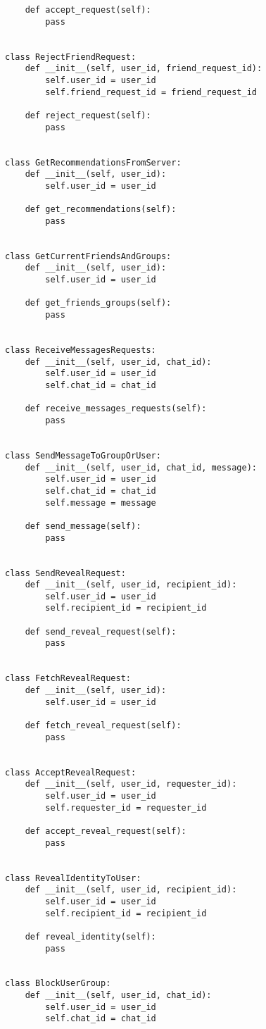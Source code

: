\documentclass[12pt,a4paper]{article}
\begin{document}
\begin{lstlisting}
    def accept_request(self):
        pass


class RejectFriendRequest:
    def __init__(self, user_id, friend_request_id):
        self.user_id = user_id
        self.friend_request_id = friend_request_id

    def reject_request(self):
        pass


class GetRecommendationsFromServer:
    def __init__(self, user_id):
        self.user_id = user_id

    def get_recommendations(self):
        pass


class GetCurrentFriendsAndGroups:
    def __init__(self, user_id):
        self.user_id = user_id

    def get_friends_groups(self):
        pass


class ReceiveMessagesRequests:
    def __init__(self, user_id, chat_id):
        self.user_id = user_id
        self.chat_id = chat_id

    def receive_messages_requests(self):
        pass


class SendMessageToGroupOrUser:
    def __init__(self, user_id, chat_id, message):
        self.user_id = user_id
        self.chat_id = chat_id
        self.message = message

    def send_message(self):
        pass


class SendRevealRequest:
    def __init__(self, user_id, recipient_id):
        self.user_id = user_id
        self.recipient_id = recipient_id

    def send_reveal_request(self):
        pass


class FetchRevealRequest:
    def __init__(self, user_id):
        self.user_id = user_id

    def fetch_reveal_request(self):
        pass


class AcceptRevealRequest:
    def __init__(self, user_id, requester_id):
        self.user_id = user_id
        self.requester_id = requester_id

    def accept_reveal_request(self):
        pass


class RevealIdentityToUser:
    def __init__(self, user_id, recipient_id):
        self.user_id = user_id
        self.recipient_id = recipient_id

    def reveal_identity(self):
        pass


class BlockUserGroup:
    def __init__(self, user_id, chat_id):
        self.user_id = user_id
        self.chat_id = chat_id


\end{lstlisting}
\end{document}

